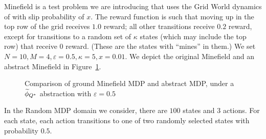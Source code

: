 

Minefield is a test problem we are introducing that uses the Grid World dynamics of \citeauthor{russell1995modern} with slip probability of $x$. The reward function is such that moving up in the top row of the grid receives $1.0$ reward; all other transitions receive $0.2$ reward, except for transitions to a random set of $\kappa$ states (which may include the top row) that receive $0$ reward. (These are the states with ``mines'' in them.) We set $N=10, M=4, \varepsilon=0.5, \kappa = 5, x = 0.01$. We depict the original Minefield and an abstract Minefield in Figure~\ref{fig:minefield-visual}.

\begin{figure}
\centering
{}
\label{fig:minefield-visual}
\caption{Comparison of ground Minefield \ac{MDP} and abstract \ac{MDP}, under a $\widetilde \phi_{Q^*}$ abstraction with $\varepsilon=0.5$}
\end{figure} 


In the Random \ac{MDP} domain we consider, there are $100$ states and $3$ actions. For each state, each action transitions to one of two randomly selected states with probability $0.5$.


